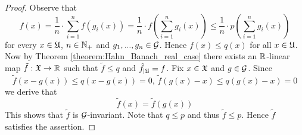 \documentclass[10pt]{amsart}
\begin{document}
\begin{proof}
	Observe that
	$$f(x) = \frac{1}{n}\cdot \sum_{i=1}^nf\left(g_i(x)\right) = \frac{1}{n}\cdot f\left(\sum_{i=1}^ng_i(x)\right) \leq \frac{1}{n}\cdot p\left(\sum_{i=1}^ng_i(x)\right)$$
	for every $x \in {\mathfrak U}$, $n\in {\mathbb N}_+$ and $g_1,...,g_n\in {\mathcal G}$. Hence $f(x) \leq q(x)$ for all $x\in {\mathfrak U}$. Now by Theorem \ref{theorem:Hahn_Banach_real_case} there exists an ${\mathbb R}$-linear map $\tilde{f}:{\mathfrak X}\rightarrow {\mathbb R}$ such that $\tilde{f} \leq q$ and $\tilde{f}_{\mid {\mathfrak U}} = f$. Fix $x \in {\mathfrak X}$ and $g \in {\mathcal G}$. Since
	$$\tilde{f}\left(x - g(x)\right) \leq q\left(x - g(x)\right) = 0,\,\tilde{f}\left(g(x) - x\right) \leq q\left(g(x) - x\right) = 0$$
	we derive that
	$$\tilde{f}(x) = \tilde{f}\left(g(x)\right)$$
	This shows that $\tilde{f}$ is ${\mathcal G}$-invariant. Note that $q \leq p$ and thus $\tilde{f} \leq p$. Hence $\tilde{f}$ satisfies the assertion.
\end{proof}




\small


\end{document}
